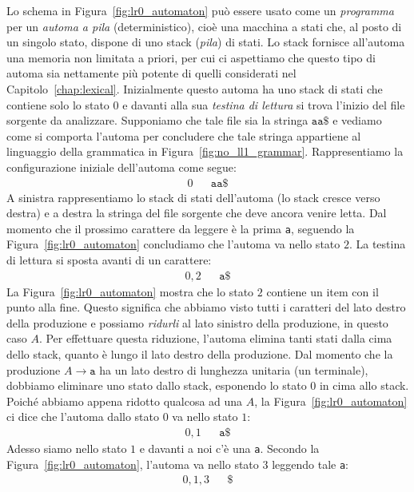 Lo schema in Figura~\ref{fig:lr0_automaton} pu\`o essere usato come
un \emph{programma} per un \emph{automa a pila} (deterministico),
cio\`e una macchina a stati che, al posto di un singolo stato,
dispone di uno stack (\emph{pila}) di stati.
Lo stack fornisce all'automa una memoria non limitata a priori, per cui
ci aspettiamo che questo tipo di automa sia nettamente pi\`u potente di
quelli considerati nel Capitolo~\ref{chap:lexical}. Inizialmente questo
automa ha uno stack di stati che contiene solo lo stato $0$ e davanti
alla sua \emph{testina di lettura} si trova l'inizio del file sorgente da
analizzare. Supponiamo che tale file sia la stringa $\mathtt{aa\$}$ e vediamo
come si comporta l'automa per concludere che tale stringa appartiene al
linguaggio della grammatica in Figura~\ref{fig:no_ll1_grammar}.
Rappresentiamo la configurazione iniziale dell'automa come segue:
\begin{align*}
  0 & & \mathtt{aa\$}
\end{align*}
A sinistra rappresentiamo lo stack di stati dell'automa (lo stack cresce verso
destra) e a destra la stringa del file sorgente che deve ancora venire letta.
Dal momento che il prossimo carattere da leggere \`e la prima \texttt{a},
seguendo la Figura~\ref{fig:lr0_automaton} concludiamo che l'automa
va nello stato $2$. La testina di lettura si sposta avanti di un carattere:
\begin{align*}
  0,2 & & \mathtt{a\$}
\end{align*}
La Figura~\ref{fig:lr0_automaton} mostra che lo stato $2$ contiene un item
con il punto alla fine. Questo significa che abbiamo visto tutti i caratteri
del lato destro della produzione e possiamo \emph{ridurli} al lato sinistro
della produzione, in questo caso $A$. Per effettuare questa riduzione, l'automa
elimina tanti stati dalla cima dello stack, quanto \`e lungo il lato destro
della produzione. Dal momento che la produzione $A\to\mathtt{a}$ ha un
lato destro di lunghezza unitaria (un terminale), dobbiamo eliminare uno
stato dallo stack, esponendo lo stato $0$ in cima allo stack.
Poich\'e abbiamo appena ridotto qualcosa
ad una $A$, la Figura~\ref{fig:lr0_automaton}
ci dice che l'automa dallo stato $0$ va nello stato $1$:
\begin{align*}
  0,1 & & \mathtt{a\$}
\end{align*}
Adesso siamo nello stato $1$ e davanti a noi c'\`e una \texttt{a}.
Secondo la Figura~\ref{fig:lr0_automaton}, l'automa va nello stato
$3$ leggendo tale \texttt{a}:
\begin{align*}
  0,1,3 & & \mathtt{\$}
\end{align*}
